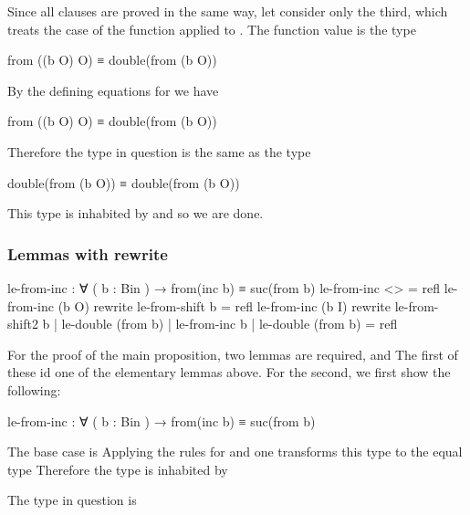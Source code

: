 Since all clauses are proved in the same way, let consider only the third, which treats the case of the function  applied  to . The function value is the type

\begin{colored}[elm]
from ((b O) O) ≡ double(from (b O))
\end{colored}

By the defining equations for  we have

\begin{colored}[elm]
from ((b O) O) ≡ double(from (b O))
\end{colored}

Therefore the type in question is the same as the type

\begin{colored}[elm]
double(from (b O)) ≡ double(from (b O))
\end{colored}

This type is inhabited by   and so we are done.

\subsubsection{Lemmas with rewrite}

\begin{colored}[elm]
le-from-inc : ∀ ( b : Bin ) → from(inc b) ≡ suc(from b)
le-from-inc <> = refl
le-from-inc (b O)  rewrite le-from-shift b = refl 
le-from-inc (b I) rewrite le-from-shift2 b | 
   le-double (from b) | le-from-inc b | 
   le-double (from b) = refl
\end{colored}

For the proof of the main proposition, two lemmas are required,  and  The first of these id one of the elementary lemmas above. For the second, we first show the following:

\begin{colored}[elm]
le-from-inc : ∀ ( b : Bin ) → from(inc b) ≡ suc(from b)
\end{colored}


The base case is  Applying the rules for  and  one transforms this type to the equal type  Therefore the type  is inhabited by 


The type in question is

